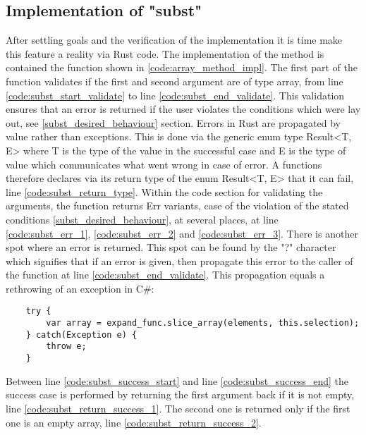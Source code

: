 
\subsection{Implementation of "subst"}

After settling goals and the verification of the implementation it is time make this feature a reality via Rust code.
The implementation of the method is contained the function shown in \ref{code:array_method_impl}.
The first part of the function validates if the first and second argument are of type array,
from line \ref{code:subst_start_validate} to line \ref{code:subst_end_validate}.
This validation ensures that an error is returned if the user violates the conditions which were lay out, see \ref{subst_desired_behaviour} section.
Errors in Rust are propagated by value rather than exceptions. This is done via the generic enum type Result<T, E> where T is the type of the value in the successful case
and E is the type of value which communicates what went wrong in case of error.
A functions therefore declares via its return type of the enum Result<T, E> that it can fail, line \ref{code:subst_return_type}.
Within the code section for validating the arguments, the function returns Err variants, case of the violation of the stated conditions
\ref{subst_desired_behaviour}, at several places, at line \ref{code:subst_err_1}, \ref{code:subst_err_2} and \ref{code:subst_err_3}.
There is another spot where an error is returned. This spot can be found by the "?" character which signifies that if an error is given,
then propagate this error to the caller of the function at line \ref{code:subst_end_validate}.
This propagation equals a rethrowing of an exception in C\#:

\begin{verbatim}
	try {
		var array = expand_func.slice_array(elements, this.selection);
	} catch(Exception e) {
		throw e;
	}
\end{verbatim}

Between line \ref{code:subst_success_start} and line \ref{code:subst_success_end} the success case is performed by returning the first argument back if it is not empty, line \ref{code:subst_return_success_1}.
The second one is returned only if the first one is an empty array, line \ref{code:subst_return_success_2}.


